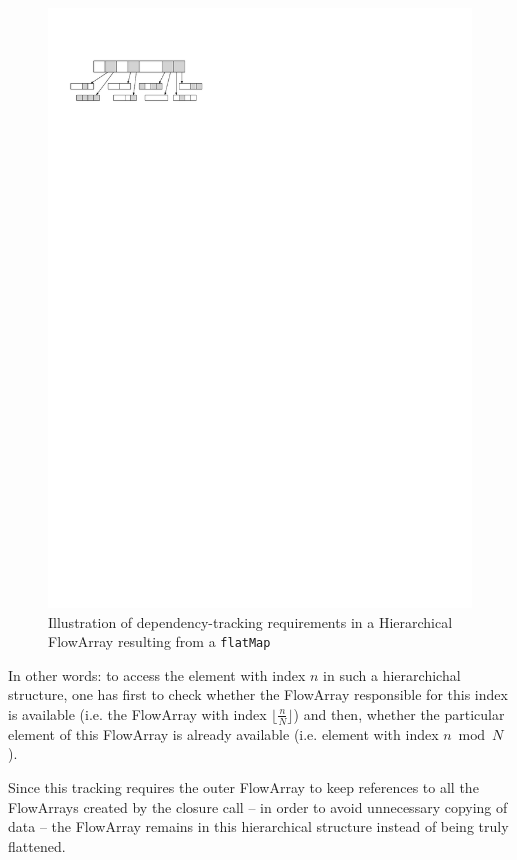 \documentclass[runningheads,a4paper,fleqn]{llncs}
\begin{document}
\begin{figure}
  \centering
  \includegraphics{flatMap-dependency}
  \caption{Illustration of dependency-tracking requirements in a
    Hierarchical FlowArray resulting from a \texttt{flatMap}}
  \label{fig:flatMap-dependency}
\end{figure}


In other words: to access the element with index $n$ in
such a hierarchichal structure, one has first to check whether the
FlowArray responsible for this index is available (i.e. the FlowArray
with index $\lfloor \frac nN \rfloor$) and then, whether
the particular element of this FlowArray is already available
(i.e. element with index $n \bmod N$).

Since this tracking requires the outer FlowArray to keep references to
all the FlowArrays created by the closure call -- in order to avoid
unnecessary copying of data -- the FlowArray remains in this
hierarchical structure instead of being truly flattened.
\end{document}
